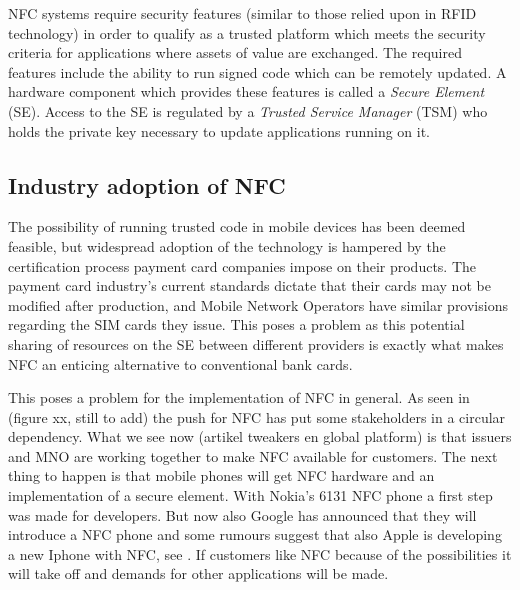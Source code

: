 NFC systems require security features (similar to those relied upon in RFID technology) in order to qualify as a trusted platform which meets the security criteria for applications where assets of value are exchanged.
The required features include the ability to run signed code which can be remotely updated.
A hardware component which provides these features is called a \textit{Secure Element} (SE).
Access to the SE is regulated by a \textit{Trusted Service Manager} (TSM) who holds the private key necessary to update applications running on it.

\subsection{Industry adoption of NFC}
The possibility of running trusted code in mobile devices has been deemed feasible, but widespread adoption of the technology is hampered by the certification process payment card companies impose on their products.
The payment card industry's current standards dictate that their cards may not be modified after production, and Mobile Network Operators have similar provisions regarding the SIM cards they issue.
This poses a problem as this potential sharing of resources on the SE between different providers is exactly what makes NFC an enticing alternative to conventional bank cards. \cite{1497411}

This poses a problem for the implementation of NFC in general.
As seen in (figure xx, still to add) the push for NFC has put some stakeholders in a circular dependency.
What we see now (artikel tweakers en global platform) is that issuers and MNO are working together to make NFC available for customers.
The next thing to happen is that mobile phones will get NFC hardware and an implementation of a secure element.
With Nokia's 6131 NFC phone a first step was made for developers.
But now also Google has announced that they will introduce a NFC phone and some rumours suggest that also Apple is developing a new Iphone with NFC, see \cite{nu_artikel}.
If customers like NFC because of the possibilities it will take off and demands for other applications will be made. 



